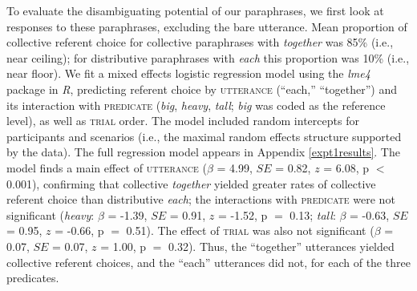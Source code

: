 \documentclass[preprint,12pt,authoryear,titlepage]{elsarticle}
\newcommand{\ndg}[1]{\textcolor{Green}{[ndg: #1]}}
\newcommand{\gcs}[1]{\textcolor{blue}{[gcs: #1]}}
\begin{document}
To evaluate the disambiguating potential of our paraphrases, we first look at responses to these paraphrases, excluding the bare utterance. Mean proportion of collective referent choice for collective paraphrases with \emph{together} was 85\% (i.e., near ceiling); for distributive paraphrases with \emph{each} this proportion was 10\% (i.e., near floor). We fit a mixed effects logistic regression model \citep{baayenetal2008} using the \emph{lme4} package \citep{batesetal2014} in \emph{R}, predicting referent choice by \textsc{utterance} (``each,'' ``together'') and its interaction with \textsc{predicate} (\emph{big}, \emph{heavy}, \emph{tall}; \emph{big} was coded as the reference level), as well as \textsc{trial} order.  The model included random intercepts for participants and scenarios (i.e., the maximal random effects structure supported by the data). The full regression model appears in Appendix \ref{expt1results}. The model finds a main effect of \textsc{utterance} ($\beta$ = 4.99, $SE$ = 0.82, $z$ = 6.08, p $<$ 0.001), confirming that collective \emph{together} yielded greater rates of collective referent choice than distributive \emph{each}; the interactions with \textsc{predicate} were not significant (\emph{heavy}: $\beta$ = -1.39, $SE$ = 0.91, $z$ = -1.52, p $=$ 0.13; \emph{tall}: $\beta$ = -0.63, $SE$ = 0.95, $z$ = -0.66, p $=$ 0.51). The effect of \textsc{trial} was also not significant ($\beta$ = 0.07, $SE$ = 0.07, $z$ = 1.00, p $=$ 0.32). Thus, the ``together'' utterances yielded collective referent choices, and the ``each'' utterances did not, for each of the three predicates.
\end{document}
